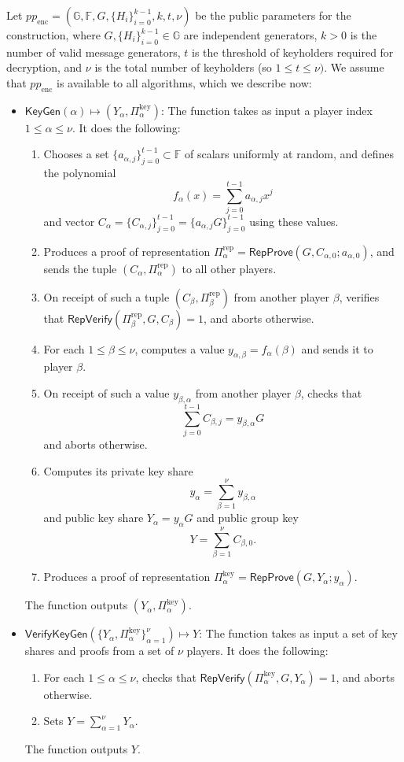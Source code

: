 \documentclass{llncs}
\newcommand{\G}{\mathbb{G}}
\newcommand{\F}{\mathbb{F}}
\newcommand{\func}[1]{\mathsf{#1}}
\begin{document}
Let $pp_{\text{enc}} = (\G, \F, G, \{H_i\}_{i=0}^{k-1}, k, t, \nu)$ be the public parameters for the construction, where $G, \{H_i\}_{i=0}^{k-1} \in \G$ are independent generators, $k > 0$ is the number of valid message generators, $t$ is the threshold of keyholders required for decryption, and $\nu$ is the total number of keyholders (so $1 \leq t \leq \nu)$.
We assume that $pp_{\text{enc}}$ is available to all algorithms, which we describe now:
\begin{itemize}
    \item $\func{KeyGen}(\alpha) \mapsto (Y_\alpha, \Pi_\alpha^{\text{key}})$: The function takes as input a player index $1 \leq \alpha \leq \nu$.
    It does the following:
    \begin{enumerate}
        \item Chooses a set $\{a_{\alpha,j}\}_{j=0}^{t-1} \subset \F$ of scalars uniformly at random, and defines the polynomial \[ f_\alpha(x) = \sum_{j=0}^{t-1} a_{\alpha,j}x^j\] and vector $C_\alpha = \{C_{\alpha,j}\}_{j=0}^{t-1} = \{a_{\alpha,j}G\}_{j=0}^{t-1}$ using these values.
        \item Produces a proof of representation $\Pi_\alpha^{\text{rep}} = \func{RepProve}(G, C_{\alpha,0} ; a_{\alpha,0})$, and sends the tuple $(C_\alpha, \Pi_\alpha^{\text{rep}})$ to all other players.
        \item On receipt of such a tuple $(C_\beta, \Pi_\beta^{\text{rep}})$ from another player $\beta$, verifies that $\func{RepVerify}(\Pi_\beta^{\text{rep}}, G, C_\beta) = 1$, and aborts otherwise.
        \item For each $1 \leq \beta \leq \nu$, computes a value $y_{\alpha, \beta} = f_\alpha(\beta)$ and sends it to player $\beta$.
        \item On receipt of such a value $y_{\beta,\alpha}$ from another player $\beta$, checks that \[ \sum_{j=0}^{t-1} C_{\beta,j} = y_{\beta,\alpha}G \] and aborts otherwise.
        \item Computes its private key share \[ y_\alpha = \sum_{\beta=1}^{\nu} y_{\beta,\alpha} \] and public key share $Y_\alpha = y_\alpha G$ and public group key \[ Y = \sum_{\beta=1}^{\nu} C_{\beta,0}. \]
        \item Produces a proof of representation $\Pi_\alpha^{\text{key}} = \func{RepProve}(G, Y_\alpha ; y_\alpha)$.
    \end{enumerate}
    The function outputs $(Y_\alpha, \Pi_\alpha^{\text{key}})$.
    
    \item $\func{VerifyKeyGen}(\{Y_\alpha, \Pi_\alpha^{\text{key}}\}_{\alpha=1}^{\nu}) \mapsto Y$: The function takes as input a set of key shares and proofs from a set of $\nu$ players.
    It does the following:
    \begin{enumerate}
        \item For each $1 \leq \alpha \leq \nu$, checks that $\func{RepVerify}(\Pi_\alpha^{\text{key}}, G, Y_\alpha) = 1$, and aborts otherwise.
        \item Sets $Y = \sum_{\alpha=1}^{\nu} Y_\alpha$.
    \end{enumerate}
    The function outputs $Y$.
    

\end{itemize}
\end{document}
